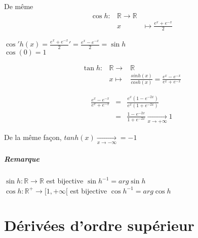 De même \[ 
\begin{array}{rcl}
\cos h :& \mathbb{R} \rightarrow \mathbb{R} \\
&x& \mapsto \frac{e^x + e^{-x}}{2}
\end{array}\]

$\cos 'h(x) = \frac{e^x + e^{-x}}{2}' = \frac{e^x - e^{-x}}{2} = \sin h$
~\\ $\cos(0) = 1$





\[ 
\begin{array}{rcl}
\tan h :& \mathbb{R} \rightarrow &\mathbb{R} \\
&x \mapsto & \frac{sinh(x)}{cosh(x)} = \frac{e^x - e^{-x}}{e^x + e^{-x}}
\end{array}\]

\[\begin{array}{rcl}
\frac{e^x - e^{-x}}{e^x + e^{-x}} &=& \frac{e^x(1-e^{-2x})}{e^x(1+e^{-2x})} \\
														  &=& \frac{1-e^{-2x}}{1+e^{-2x}} \xrightarrow[x \to +\infty]{} 1

\end{array}\]

De la même façon, $tan h(x) \xrightarrow[x \to -\infty]{} = -1$


\paragraph{Remarque} $\sin h : \mathbb{R} \rightarrow \mathbb{R}$ est bijective $\sin h^{-1} = arg \sin h$~\\
$\cos h : \mathbb{R}^+ \rightarrow [1, +\infty[$ est bijective $\cos h^{-1} = arg \cos h$

\chapter{Dérivées d'ordre supérieur}

